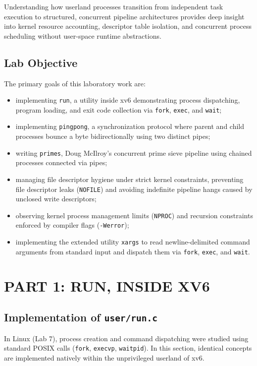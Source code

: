 \documentclass[12pt,a4paper]{report}
\numberwithin{equation}{chapter}
\numberwithin{figure}{chapter}
\numberwithin{table}{chapter}
\begin{document}
Understanding how userland processes transition from independent task execution to structured, concurrent pipeline architectures provides deep insight into kernel resource accounting, descriptor table isolation, and concurrent process scheduling without user-space runtime abstractions.

\section{Lab Objective}
The primary goals of this laboratory work are:
\begin{itemize}
    \item implementing \texttt{run}, a utility inside xv6 demonstrating process dispatching, program loading, and exit code collection via \texttt{fork}, \texttt{exec}, and \texttt{wait};
    \item implementing \texttt{pingpong}, a synchronization protocol where parent and child processes bounce a byte bidirectionally using two distinct pipes;
    \item writing \texttt{primes}, Doug McIlroy's concurrent prime sieve pipeline using chained processes connected via pipes;
    \item managing file descriptor hygiene under strict kernel constraints, preventing file descriptor leaks (\texttt{NOFILE}) and avoiding indefinite pipeline hangs caused by unclosed write descriptors;
    \item observing kernel process management limits (\texttt{NPROC}) and recursion constraints enforced by compiler flags (\texttt{-Werror});
    \item implementing the extended utility \texttt{xargs} to read newline-delimited command arguments from standard input and dispatch them via \texttt{fork}, \texttt{exec}, and \texttt{wait}.
\end{itemize}

\chapter{PART 1: RUN, INSIDE XV6}

\section{Implementation of \texttt{user/run.c}}
In Linux (Lab 7), process creation and command dispatching were studied using standard POSIX calls (\texttt{fork}, \texttt{execvp}, \texttt{waitpid}). In this section, identical concepts are implemented natively within the unprivileged userland of xv6. 
\end{document}
